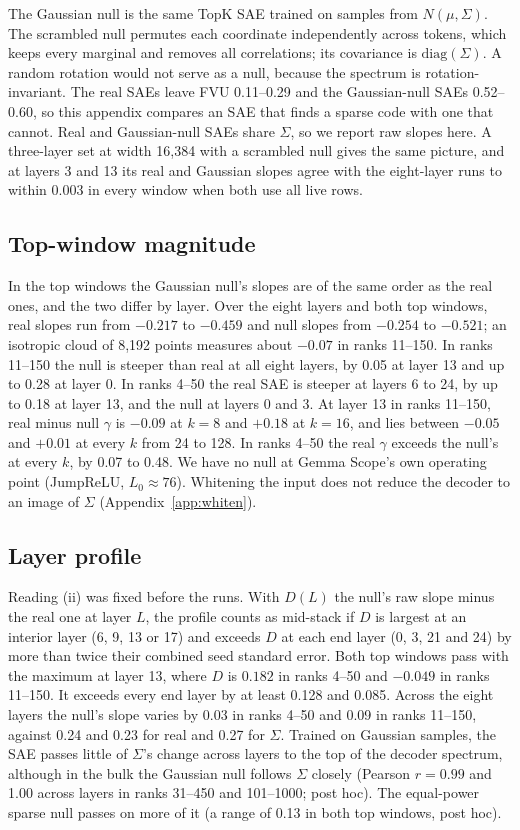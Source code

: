 \documentclass[10pt,twocolumn]{article}
\newcommand{\Sig}{\Sigma}
\newcommand{\Lz}{L_0}
\begin{document}
The Gaussian null is the same TopK SAE trained on samples from $N(\mu,\Sig)$. The scrambled null permutes each coordinate independently across tokens, which keeps every marginal and removes all correlations; its covariance is $\mathrm{diag}(\Sig)$. A random rotation would not serve as a null, because the spectrum is rotation-invariant. The real SAEs leave FVU 0.11--0.29 and the Gaussian-null SAEs 0.52--0.60, so this appendix compares an SAE that finds a sparse code with one that cannot. Real and Gaussian-null SAEs share $\Sig$, so we report raw slopes here. A three-layer set at width 16,384 with a scrambled null gives the same picture, and at layers 3 and 13 its real and Gaussian slopes agree with the eight-layer runs to within 0.003 in every window when both use all live rows.

\subsection{Top-window magnitude}
\label{app:gtop}

In the top windows the Gaussian null's slopes are of the same order as the real ones, and the two differ by layer. Over the eight layers and both top windows, real slopes run from $-0.217$ to $-0.459$ and null slopes from $-0.254$ to $-0.521$; an isotropic cloud of 8,192 points measures about $-0.07$ in ranks 11--150. In ranks 11--150 the null is steeper than real at all eight layers, by 0.05 at layer 13 and up to 0.28 at layer 0. In ranks 4--50 the real SAE is steeper at layers 6 to 24, by up to 0.18 at layer 13, and the null at layers 0 and 3. At layer 13 in ranks 11--150, real minus null $\gamma$ is $-0.09$ at $k=8$ and $+0.18$ at $k=16$, and lies between $-0.05$ and $+0.01$ at every $k$ from 24 to 128. In ranks 4--50 the real $\gamma$ exceeds the null's at every $k$, by 0.07 to 0.48. We have no null at Gemma Scope's own operating point (JumpReLU, $\Lz \approx 76$). Whitening the input does not reduce the decoder to an image of $\Sig$ (Appendix~\ref{app:whiten}).

\subsection{Layer profile}
\label{app:gprofile}

Reading (ii) was fixed before the runs. With $D(L)$ the null's raw slope minus the real one at layer $L$, the profile counts as mid-stack if $D$ is largest at an interior layer (6, 9, 13 or 17) and exceeds $D$ at each end layer (0, 3, 21 and 24) by more than twice their combined seed standard error. Both top windows pass with the maximum at layer 13, where $D$ is $0.182$ in ranks 4--50 and $-0.049$ in ranks 11--150. It exceeds every end layer by at least 0.128 and 0.085. Across the eight layers the null's slope varies by 0.03 in ranks 4--50 and 0.09 in ranks 11--150, against 0.24 and 0.23 for real and 0.27 for $\Sig$. Trained on Gaussian samples, the SAE passes little of $\Sig$'s change across layers to the top of the decoder spectrum, although in the bulk the Gaussian null follows $\Sig$ closely (Pearson $r=0.99$ and 1.00 across layers in ranks 31--450 and 101--1000; post hoc). The equal-power sparse null passes on more of it (a range of 0.13 in both top windows, post hoc).
\end{document}

